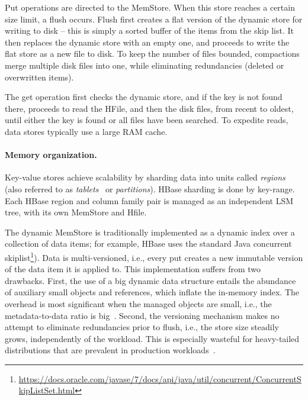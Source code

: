 Put operations are directed to the MemStore.
When this store reaches a certain size limit, a flush occurs. 
Flush first creates a flat version of the dynamic store for writing to disk -- this is simply a sorted buffer of the items from the skip list.  
It then replaces the dynamic store with an empty one, and proceeds to write the flat store as a new file to disk.
 To keep the number of files bounded, compactions merge multiple disk files into one, while eliminating redundancies 
 (deleted or overwritten items). 

The get operation first checks the dynamic store, and if the key is not found there, proceeds to read the HFile, and 
then the disk files, from recent to oldest, until either the key is found or all files have been searched. 
To expedite reads, data stores typically use a large RAM cache. 

\paragraph{Memory organization.}
Key-value stores achieve scalability by sharding data into units called \emph{regions}
(also referred to as \emph{tablets}~\cite{Chang2008, PNUTS2008} or \emph{partitions}).
HBase sharding is done by key-range.
Each HBase region and column family pair is managed as an independent LSM tree, with its own MemStore and Hfile.

The dynamic MemStore is traditionally implemented as a dynamic index over a collection of data items; 
for example,  HBase uses the standard Java concurrent skiplist\footnote{\small{\url{https://docs.oracle.com/javase/7/docs/api/java/util/concurrent/ConcurrentSkipListSet.html}}}).
Data is multi-versioned, i.e., every put creates a new immutable version of the data item it is applied to. 
%
This implementation suffers from two drawbacks. First, the use of a big dynamic data structure entails 
the abundance of auxiliary small objects and references, which inflate the in-memory index. 
The overhead is most significant when the managed objects
are small, i.e., the metadata-to-data ratio is big~\cite{Wu2015}. Second, the versioning mechanism makes 
no attempt to eliminate redundancies prior to flush, i.e., the store size  steadily grows, independently of the workload. 
This is especially wasteful for heavy-tailed distributions that are prevalent in production workloads~\cite{Devineni:2015}.

